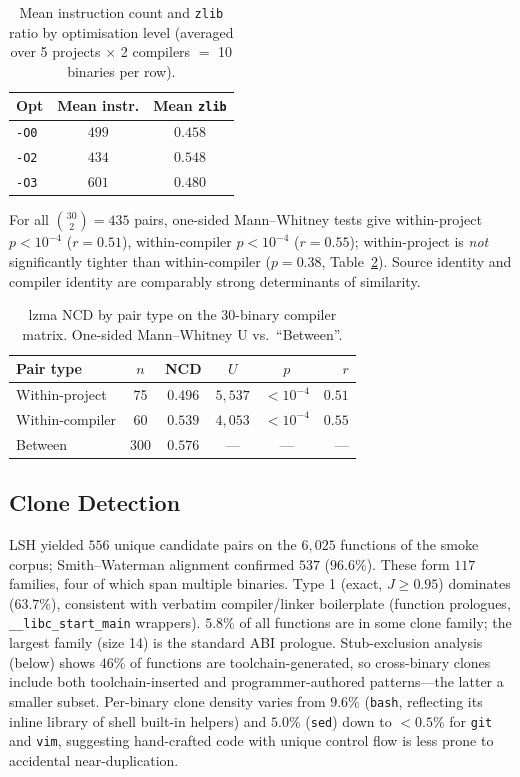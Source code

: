 \documentclass[conference]{IEEEtran}
\newcommand{\zlib}{\texttt{zlib}}
\begin{document}
\begin{table}[t]
\centering
\caption{Mean instruction count and \zlib{} ratio by optimisation
         level (averaged over 5 projects $\times$ 2 compilers
         $=$ 10 binaries per row).}
\label{tab:opt_level}
\begin{tabular}{@{}lcc@{}}
\toprule
\textbf{Opt} & \textbf{Mean instr.} & \textbf{Mean \zlib{}} \\
\midrule
\texttt{-O0} & $499$ & $0.458$ \\
\texttt{-O2} & $434$ & $0.548$ \\
\texttt{-O3} & $601$ & $0.480$ \\
\bottomrule
\end{tabular}
\end{table}
For all $\binom{30}{2}{=}435$ pairs, one-sided Mann--Whitney
tests give within-project $p{<}10^{-4}$ ($r{=}0.51$), within-compiler
$p{<}10^{-4}$ ($r{=}0.55$); within-project is \emph{not} significantly
tighter than within-compiler ($p{=}0.38$, Table~\ref{tab:proj_vs_cc}).  Source identity and
compiler identity are comparably strong determinants of similarity.

\begin{table}[t]
\centering
\caption{lzma NCD by pair type on the 30-binary compiler matrix.
         One-sided Mann--Whitney U vs.\ ``Between''.}
\label{tab:proj_vs_cc}
\begin{tabular}{@{}lccccr@{}}
\toprule
\textbf{Pair type} & $n$ & \textbf{NCD} & $U$ & $p$ & $r$ \\
\midrule
Within-project   & 75  & $0.496$ & $5{,}537$ & $<10^{-4}$ & $0.51$ \\
Within-compiler  & 60  & $0.539$ & $4{,}053$ & $<10^{-4}$ & $0.55$ \\
Between          & 300 & $0.576$ & ---       & ---        & ---    \\
\bottomrule
\end{tabular}
\end{table}

\subsection{Clone Detection}

LSH yielded $556$ unique candidate pairs on the $6{,}025$ functions of
the smoke corpus; Smith--Waterman alignment confirmed $537$ ($96.6\%$).
These form $117$ families, four of which span multiple binaries.
Type 1 (exact, $J{\geq}0.95$) dominates ($63.7\%$), consistent with
verbatim compiler/linker boilerplate (function prologues,
\texttt{\_\_libc\_start\_main} wrappers).  $5.8\%$ of all functions are
in some clone family; the largest family (size 14) is the standard ABI
prologue.  Stub-exclusion analysis (below) shows $46\%$ of functions
are toolchain-generated, so cross-binary clones include both
toolchain-inserted and programmer-authored patterns---the latter a
smaller subset.  Per-binary clone density varies from $9.6\%$
(\texttt{bash}, reflecting its inline library of shell built-in helpers)
and $5.0\%$ (\texttt{sed}) down to ${<}0.5\%$ for \texttt{git} and
\texttt{vim}, suggesting hand-crafted code with unique control flow
is less prone to accidental near-duplication.
\end{document}
